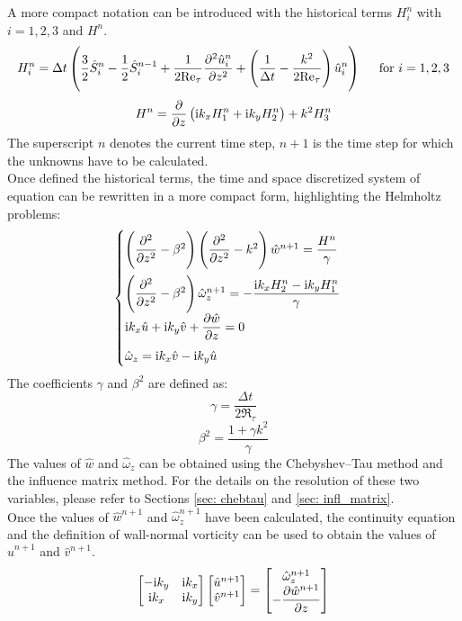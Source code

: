 A more compact notation can be introduced with the historical terms $H_i^n$ with $i=1,2,3$ and $H^n$.
\[
H_i^n=\Delta t\left( \frac{3}{2}\hat S_i^n-\frac12\hat S_i^{n-1}+\frac{1}{2\textnormal{Re}_\tau}\frac{\partial^2\hat u_i^n}{\partial z^2}+\left(\frac{1}{\Delta t}-\frac{k^2}{2\textnormal{Re}_\tau}   \right)\hat u_i^n\right) \hspace{0.5cm} \textnormal{for }i=1,2,3
\]
\[
H^n=\frac{\partial}{\partial z}\left(\textnormal{i}k_xH_1^n+\textnormal{i}k_yH_2^n\right) +k^2H_3^n
\]
The superscript $n$ denotes the current time step, $n+1$ is the time step for which the unknowns have to be calculated.\\
Once defined the historical terms, the time and space discretized system of equation can be rewritten in a more compact form, highlighting the Helmholtz problems:
\begin{equation}
\begin{cases}
\left(\dfrac{\partial^2}{\partial z^2}-\beta^2\right)\left(\dfrac{\partial^2}{\partial z^2}-k^2\right)\hat w^{n+1}=\dfrac{H^n}{\gamma}\\[3ex]
\left(\dfrac{\partial^2 }{\partial z^2}-\beta^2\right)\hat\omega_z^{n+1}=-\dfrac{\textnormal{i}k_xH_2^n-\textnormal{i}k_yH_1^n}{\gamma}  \\[2ex]
\textnormal{i}k_x \hat u+\textnormal{i}k_y\hat v+\dfrac{\partial\hat w}{\partial z}=0 \\[2ex]
\hat\omega_z=\textnormal{i}k_x\hat v-\textnormal{i} k_y\hat u
\end{cases}
\end{equation}
The coefficients $\gamma$ and $\beta^2$ are defined as:
\[
\gamma=\frac{\Delta t}{2\Re_\tau}
\]
\[
\beta^2=\frac{1+\gamma k^2}{\gamma}
\]
The values of $\hat w$ and $\hat \omega_z$ can be obtained using the Chebyshev--Tau method and the influence matrix method. For the details on the resolution of these two variables, please refer to Sections \ref{sec: chebtau} and \ref{sec: infl_matrix}. \\
Once the values of $\hat w^{n+1}$ and $\hat \omega_z^{n+1}$ have been calculated, the continuity equation and the definition of wall-normal vorticity can be used to obtain the values of $\hat u^{n+1}$ and $\hat v^{n+1}$.
\[
\begin{bmatrix}
-\textnormal{i}k_y & \textnormal{i}k_x \\
\textnormal{i}k_x & \textnormal{i}k_y \\
\end{bmatrix}
\begin{bmatrix}
\hat u^{n+1}\\
\hat v^{n+1}\\
\end{bmatrix}
=
\begin{bmatrix}
\hat\omega_z^{n+1}\\
-\dfrac{\partial \hat w^{n+1}}{\partial z}
\end{bmatrix}
\]

